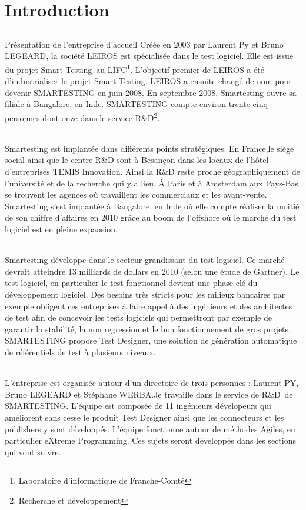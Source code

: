 \chapter{Introduction}

\section{}{Présentation de l'entreprise d'accueil}
Créée en 2003 par Laurent Py et Bruno LEGEARD, la société LEIROS est spécialisée dans le test logiciel. Elle est issue du projet Smart Testing\texttrademark ~au LIFC\footnote{Laboratoire d'informatique de Franche-Comté}. L'objectif premier de LEIROS a été d'industrialiser le projet Smart Testing\texttrademark.  LEIROS a ensuite changé de nom pour devenir SMARTESTING en juin 2008. En septembre 2008, Smartesting ouvre sa filiale à Bangalore, en Inde. SMARTESTING compte environ trente-cinq personnes dont onze dans le service R\&D{}\footnote{Recherche et développement}.

\subparagraph*{}
Smartesting est implantée dans différents points stratégiques. En France,le siège social ainsi que le centre R\&D sont à Besançon dans les locaux de l'hôtel d'entreprises TEMIS Innovation. Ainsi la R\&D reste proche géographiquement de l'université et de la recherche qui y a lieu. À Paris et à Amsterdam aux Pays-Bas se trouvent les agences où travaillent les commerciaux et les avant-vente. Smartesting s'est implantée à Bangalore, en Inde où elle compte réaliser la moitié de son chiffre d'affaires en 2010 grâce au boom de l'offshore où le marché du test logiciel est en pleine expansion.




\subparagraph*{}
Smartesting développe dans le secteur grandissant du test logiciel. Ce marché devrait atteindre 13 milliards de dollars en 2010 (selon une étude de Gartner). Le test logiciel, en particulier le test fonctionnel devient une phase clé du développement logiciel. Des besoins très stricts pour les milieux bancaires par exemple obligent ces entreprises à faire appel à des ingénieurs et des architectes de test afin de concevoir les tests logiciels qui permettront par exemple de garantir la stabilité, la non regression et le bon fonctionnement de gros projets. SMARTESTING propose Test Designer, une solution de génération automatique de référentiels de test à plusieurs niveaux.

\subparagraph*{}
L'entreprise est organisée autour d'un directoire de trois personnes : Laurent PY, Bruno LEGEARD et Stéphane WERBA.Je travaille dans le service de R\&D{}\ de SMARTESTING.  L'équipe est composée de 11 ingénieurs dévelopeurs qui améliorent sans cesse le produit Test Designer ainsi que les connecteurs et les publishers y sont développés. L'équipe fonctionne autour de méthodes Agiles, en particulier eXtreme Programming. Ces sujets seront développés dans les sections qui vont suivre.

